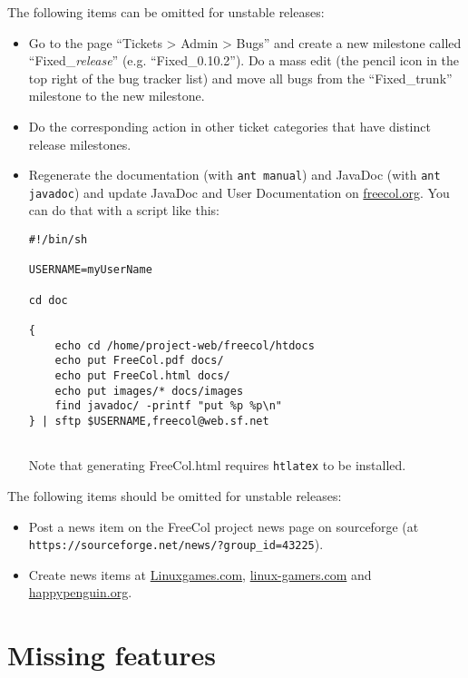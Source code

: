 \documentclass[12pt]{book}
\begin{document}
The following items can be omitted for unstable releases:

\begin{itemize}

\item Go to the page ``Tickets > Admin > Bugs'' and create a new
  milestone called ``Fixed\_\emph{release}''
  (e.g. ``Fixed\_0.10.2'').  Do a mass edit (the pencil icon in the
  top right of the bug tracker list) and move all bugs from the
  ``Fixed\_trunk'' milestone to the new milestone.

\item Do the corresponding action in other ticket categories that
  have distinct release milestones.

\item Regenerate the documentation (with \verb+ant manual+) and
  JavaDoc (with \verb+ant javadoc+) and update JavaDoc and User
  Documentation on \href{freecol.org}{freecol.org}. You can do that
  with a script like this:

\begin{verbatim}
#!/bin/sh

USERNAME=myUserName

cd doc

{
    echo cd /home/project-web/freecol/htdocs
    echo put FreeCol.pdf docs/
    echo put FreeCol.html docs/
    echo put images/* docs/images
    find javadoc/ -printf "put %p %p\n"
} | sftp $USERNAME,freecol@web.sf.net


\end{verbatim}

Note that generating FreeCol.html requires \verb+htlatex+
to be installed.


\end{itemize}

The following items should be omitted for unstable releases:

\begin{itemize}

\item Post a news item on the FreeCol project news page on sourceforge
(at \verb+https://sourceforge.net/news/?group_id=43225+).

\item Create news items at \href{Linuxgames.com}{Linuxgames.com},
  \href{linux-gamers.com}{linux-gamers.com} and
  \href{happypenguin.org}{happypenguin.org}.

\end{itemize}


\hypertarget{Missing features}{\chapter{Missing features}}
\end{document}
